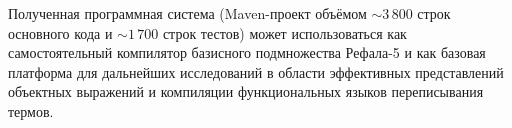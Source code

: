 \indent Полученная программная система (Maven-проект  объёмом
\(\sim 3\,800\) строк основного кода и \(\sim 1\,700\) строк тестов) может
использоваться как самостоятельный компилятор базисного подмножества
Рефала-5 и как базовая платформа для дальнейших исследований в области
эффективных представлений объектных выражений и компиляции функциональных
языков переписывания термов.
